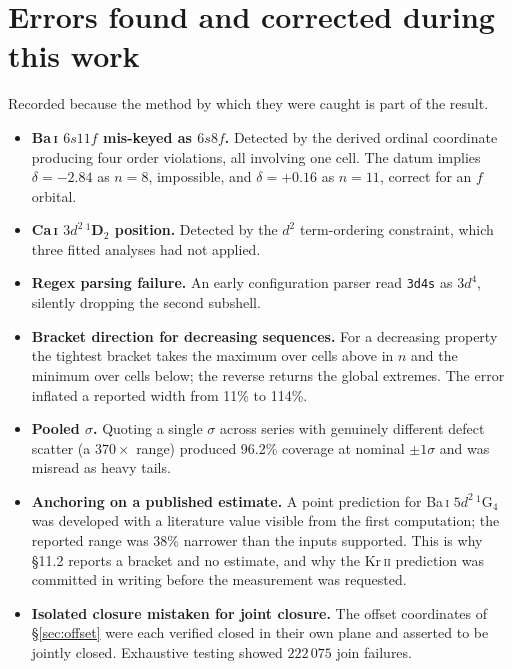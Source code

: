 \documentclass[11pt,a4paper]{article}
\theoremstyle{definition}
\begin{document}
\section{Errors found and corrected during this work}
\label{app:errors}
Recorded because the method by which they were caught is part of the result.
\begin{itemize}[leftmargin=*,itemsep=1.5pt]
\item \textbf{Ba\,\textsc{i} $6s11f$ mis-keyed as $6s8f$.} Detected by the
derived ordinal coordinate producing four order violations, all involving one
cell. The datum implies $\delta=-2.84$ as $n=8$, impossible, and $\delta=+0.16$
as $n=11$, correct for an $f$ orbital.
\item \textbf{Ca\,\textsc{i} $3d^{2}\,^1$D$_2$ position.} Detected by the
$d^{2}$ term-ordering constraint, which three fitted analyses had not applied.
\item \textbf{Regex parsing failure.} An early configuration parser read
\texttt{3d4s} as $3d^{4}$, silently dropping the second subshell.
\item \textbf{Bracket direction for decreasing sequences.} For a decreasing
property the tightest bracket takes the maximum over cells above in $n$ and the
minimum over cells below; the reverse returns the global extremes. The error
inflated a reported width from 11\% to 114\%.
\item \textbf{Pooled $\sigma$.} Quoting a single $\sigma$ across series with
genuinely different defect scatter (a $370\times$ range) produced 96.2\%
coverage at nominal $\pm1\sigma$ and was misread as heavy tails.
\item \textbf{Anchoring on a published estimate.} A point prediction for
Ba\,\textsc{i} $5d^{2}\,^1$G$_4$ was developed with a literature value visible
from the first computation; the reported range was 38\% narrower than the inputs
supported. This is why \S11.2 reports a bracket and no estimate, and why the
Kr\,\textsc{ii} prediction was committed in writing before the measurement was
requested.
\item \textbf{Isolated closure mistaken for joint closure.} The offset
coordinates of \S\ref{sec:offset} were each verified closed in their own plane
and asserted to be jointly closed. Exhaustive testing showed $222\,075$ join
failures.
\end{itemize}

\end{document}
